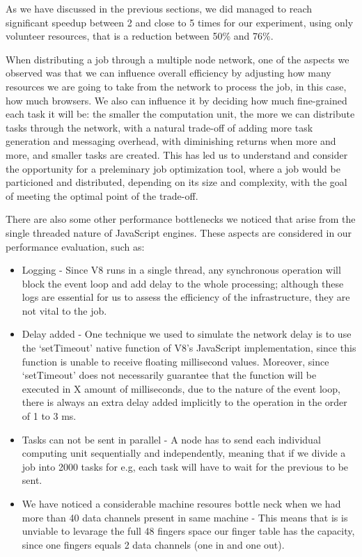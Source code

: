 As we have discussed in the previous sections, we did managed to reach significant speedup between 2 and close to 5 times for our experiment, using only volunteer resources, that is a reduction between 50\% and 76\%.

When distributing a job through a multiple node network, one of the aspects we observed was that we can influence overall efficiency by adjusting how many resources we are going to take from the network to process the job, in this case, how much browsers. We also can influence it by deciding how much fine-grained each task it will be: the smaller the computation unit, the more we can distribute tasks through the network, with a natural trade-off of adding more task generation and messaging overhead, with diminishing returns when more and more, and smaller tasks are created. This has led us to understand and consider the opportunity for a preleminary job optimization tool, where a job would be particioned and distributed, depending on its size and complexity, with the goal of meeting the optimal point of the trade-off.

There are also some other performance bottlenecks we noticed that arise from the single threaded nature of JavaScript engines. These aspects are considered in our performance evaluation, such as:

\begin{itemize}
  \item Logging - Since V8 runs in a single thread, any synchronous operation will block the event loop and add delay to the whole processing; although these logs are essential for us to assess the efficiency of the infrastructure, they are not vital to the job.
  \item Delay added - One technique we used to simulate the network delay is to use the `setTimeout' native function of V8's JavaScript implementation, since this function is unable to receive floating millisecond values. Moreover, since `setTimeout' does not necessarily guarantee that the function will be executed in X amount of milliseconds, due to the nature of the event loop, there is always an extra delay added implicitly to the operation in the order of 1 to 3 ms.
  \item Tasks can not be sent in parallel - A node has to send each individual computing unit sequentially and independently, meaning that if we divide a job into 2000 tasks for e.g, each task will have to wait for the previous to be sent.
  \item We have noticed a considerable machine resoures bottle neck when we had more than 40 data channels present in same machine - This means that is is unviable to levarage the full 48 fingers space our finger table has the capacity, since one fingers equals 2 data channels (one in and one out).
\end{itemize}

